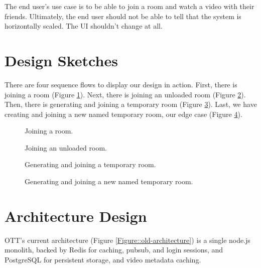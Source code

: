 The end user's use case is to be able to join a room and watch a video with their friends. Ultimately, the end user should not be
able to tell that the system is horizontally scaled. The UI shouldn't change at all.

\section{Design Sketches}

There are four sequence flows to display our design in action. First, there is joining a room (Figure \ref{Figure::room}). Next, there is joining an unloaded room (Figure \ref{Figure::unloaded}). Then, there is generating and joining a temporary room (Figure \ref{Figure::temp}). Last, we have creating and joining a new named temporary room, our edge case (Figure \ref{Figure::edge}).

\begin{figure}
  \centering
  \caption{\label{Figure::room} Joining a room.}
\end{figure}

\begin{figure}
  \centering
  \caption{\label{Figure::unloaded} Joining an unloaded room.}
\end{figure}

\begin{figure}
  \centering
  \caption{\label{Figure::temp} Generating and joining a temporary room.}
\end{figure}

\begin{figure}
  \centering
  \caption{\label{Figure::edge} Generating and joining a new named temporary room.}
\end{figure}


\newpage

\section{Architecture Design}

OTT's current architecture (Figure \ref{Figure::old-architecture}) is a single node.js monolith, backed by Redis
for caching, pubsub, and login sessions, and PostgreSQL for persistent
storage, and video metadata caching.

